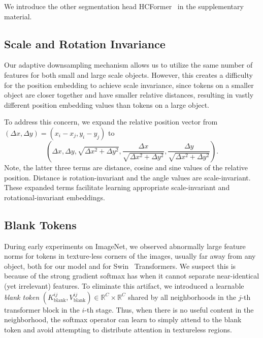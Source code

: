 \documentclass[10pt,twocolumn,letterpaper]{article}
\begin{document}
We introduce the other segmentation head HCFormer~\cite{hcformer} in the supplementary material.

\subsection{Scale and Rotation Invariance}

Our adaptive downsampling mechanism allows us to utilize the same number of features for both small and large scale objects. However, this creates a difficulty for the position embedding to achieve scale invariance, since tokens on a smaller object are closer together and have smaller relative distances, resulting in vastly different position embedding values than tokens on a large object. 

To address this concern, we expand the relative position vector from $(\Delta x, \Delta y) = (x_{i} - x_{j}, y_{i} - y_{j})$ to
\begin{equation}
    \!\left(\!\Delta x, \Delta y, \sqrt{\Delta x^2 \!+\! \Delta y^2}, \dfrac{\Delta x}{\sqrt{\Delta x^2 \!+\! \Delta y^2}}, \dfrac{\Delta y}{\sqrt{\Delta x^2 \!+\! \Delta y^2}}\!\right)\!.
\end{equation}
Note, the latter three terms are distance, cosine and sine values of the relative position. Distance is rotation-invariant and the angle values are scale-invariant. These expanded terms facilitate learning appropriate scale-invariant and rotational-invariant embeddings.


\subsection{Blank Tokens}

During early experiments on ImageNet, we observed abnormally large feature norms for tokens in texture-less corners of the images, usually far away from any  object, both for our model and for Swin~\cite{swin} Transformers. We suspect this is because of the strong gradient softmax has when it cannot separate near-identical (yet irrelevant) features. 
To eliminate this artifact, we introduced a learnable \textit{blank token} $(K_{\text{blank}}^{ij},V_{\text{blank}}^{ij})\in \mathbb{R}^{C}\times \mathbb{R}^{C}$ shared by all neighborhoods in the $j$-th transformer block in the $i$-th stage. Thus, when there is no useful content in the neighborhood, the softmax operator can learn to simply attend to the blank token and avoid attempting to distribute attention in textureless regions.  
\end{document}
